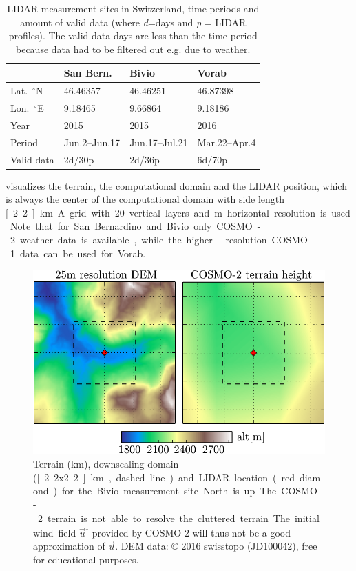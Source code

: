 \documentclass[twocolumn,letterpaper]{IEEEAerospaceCLS}
\begin{document}
\begin{table}[htb]
\centering
\caption{LIDAR measurement sites in Switzerland, time periods and amount of valid data (where \emph{d}=days and \emph{p} = LIDAR profiles). The valid data days are less than the time period because data had to be filtered out e.g. due to weather.}

\begin{tabular}{l l l l}
\toprule 
 & San Bern. & Bivio & Vorab\\[0.8ex]
\midrule
Lat.~$^\circ$N & 46.46357 & 46.46251 & 46.87398 \\
Lon.~$^\circ$E & 9.18465 & 9.66864 & 9.18186 \\
Year & 2015 & 2015 & 2016 \\
Period & Jun.2--Jun.17 & Jun.17--Jul.21 & Mar.22--Apr.4 \\ 
Valid data & 2d/30p & 2d/36p & 6d/70p\\ 
\bottomrule
\end{tabular}

\label{tab:PL_WindPred_campaign_details}
\end{table}

 visualizes the terrain, the computational domain and the LIDAR position, which is always the center of the computational domain with side length \unit[2.2]{km}. A grid with 20 vertical layers and \unit[50]{m} horizontal resolution is used. Note that for San Bernardino and Bivio only COSMO-2 weather data is available, while the higher-resolution COSMO-1 data can be used for Vorab.

\begin{figure}[tbp]
\centering
\includegraphics[width=\columnwidth]{images/WindPred/Results/terrain_bivio2.pdf}
\caption[Terrain measurement locations]{Terrain (\unit[5x5]{km}), downscaling domain (\unit[2.2x2.2]{km}, dashed line) and LIDAR location (red diamond) for the Bivio measurement site. North is up. The COSMO-2 terrain is not able to resolve the cluttered terrain. The initial wind field $\vec{u}^\text{I}$ provided by COSMO-2 will thus not be a good approximation of $\vec{u}$. DEM data: \copyright{} 2016 swisstopo (JD100042), free for educational purposes.}
\label{fig:PL_WindPred_terrains}
\end{figure}
\end{document}
